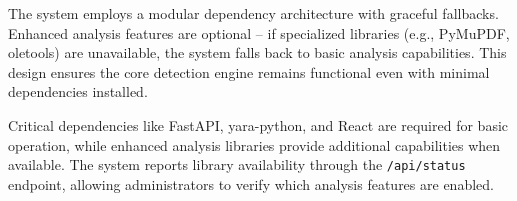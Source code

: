 The system employs a modular dependency architecture with graceful fallbacks. Enhanced analysis features are optional -- if specialized libraries (e.g., PyMuPDF, oletools) are unavailable, the system falls back to basic analysis capabilities. This design ensures the core detection engine remains functional even with minimal dependencies installed.

Critical dependencies like FastAPI, yara-python, and React are required for basic operation, while enhanced analysis libraries provide additional capabilities when available. The system reports library availability through the \texttt{/api/status} endpoint, allowing administrators to verify which analysis features are enabled.
